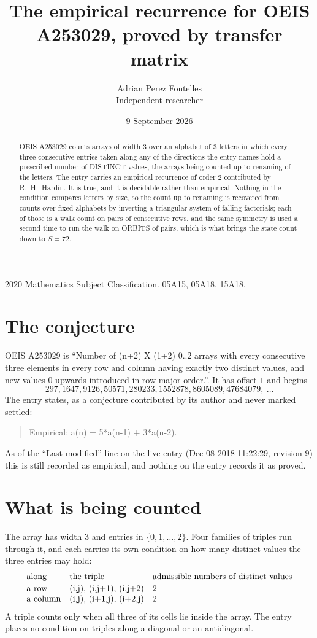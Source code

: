 \documentclass[11pt,a4paper]{article}
\title{The empirical recurrence for OEIS A253029, proved by transfer matrix}
\author{Adrian Perez Fontelles\\ \small Independent researcher}
\date{9 September 2026}
\theoremstyle{plain}
\theoremstyle{definition}
\begin{document}
\maketitle

\begin{abstract}
OEIS A253029 counts arrays of width $3$ over an alphabet of $3$ letters in which every three
consecutive entries taken along any of the directions the entry names hold a prescribed number of
DISTINCT values, the arrays being counted up to renaming of the letters. The entry carries an
empirical recurrence of order $2$ contributed by R.~H.~Hardin. It is true, and it is
decidable rather than empirical. Nothing in the condition compares letters by size, so the
count up to renaming is recovered from counts over fixed alphabets by inverting a triangular
system of falling factorials; each of those is a walk count on pairs of consecutive rows, and
the same symmetry is used a second time to run the walk on ORBITS of pairs, which is what
brings the state count down to $S=72$.
\end{abstract}

\noindent\small 2020 Mathematics Subject Classification. 05A15, 05A18, 15A18.\normalsize

\section{The conjecture}

OEIS A253029 is ``Number of (n+2) X (1+2) 0..2 arrays with every consecutive three elements in every row and column having exactly two distinct values, and new values 0 upwards introduced in row major order.''. It has offset $1$ and begins
\[
297, 1647, 9126, 50571, 280233, 1552878, 8605089, 47684079,\ \dots
\]
The entry states, as a conjecture contributed by its author and never marked settled:
\begin{quote}
Empirical: a(n) = 5*a(n-1) + 3*a(n-2).
\end{quote}
As of the ``Last modified'' line on the live entry (Dec 08 2018 11:22:29, revision 9) this is still
recorded as empirical, and nothing on the entry records it as proved.

\section{What is being counted}

The array has width $3$ and entries in $\{0,1,\dots,2\}$. Four families of triples
run through it, and each carries its own condition on how many distinct values the three
entries may hold:
\[
\begin{array}{lll}
\text{along} & \text{the triple} & \text{admissible numbers of distinct values} \\[2pt]
\text{a row} & $(i,j),\ (i,j+1),\ (i,j+2)$ & $2$ \\
\text{a column} & $(i,j),\ (i+1,j),\ (i+2,j)$ & $2$ \\
\end{array}
\]
A triple counts only when all three of its cells lie inside the array. The entry places no condition on triples along a diagonal or an antidiagonal.
\end{document}

